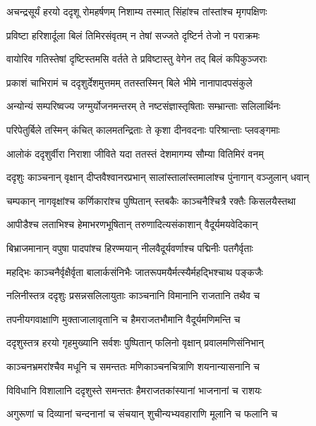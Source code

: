 \twolineshloka
{अचन्द्रसूर्यं हरयो ददृशू रोमहर्षणम्}
{निशाम्य तस्मात् सिंहांश्च तांस्तांश्च मृगपक्षिणः} %

\twolineshloka
{प्रविष्टा हरिशार्दूला बिलं तिमिरसंवृतम्}
{न तेषां सज्जते दृष्टिर्न तेजो न पराक्रमः} %

\twolineshloka
{वायोरिव गतिस्तेषां दृष्टिस्तमसि वर्तते}
{ते प्रविष्टास्तु वेगेन तद् बिलं कपिकुञ्जराः} %

\twolineshloka
{प्रकाशं चाभिरामं च ददृशुर्देशमुत्तमम्}
{ततस्तस्मिन् बिले भीमे नानापादपसंकुले} %

\twolineshloka
{अन्योन्यं सम्परिष्वज्य जग्मुर्योजनमन्तरम्}
{ते नष्टसंज्ञास्तृषिताः सम्भ्रान्ताः सलिलार्थिनः} %

\twolineshloka
{परिपेतुर्बिले तस्मिन् कंचित् कालमतन्द्रिताः}
{ते कृशा दीनवदनाः परिश्रान्ताः प्लवङ्गमाः} %

\twolineshloka
{आलोकं ददृशुर्वीरा निराशा जीविते यदा}
{ततस्तं देशमागम्य सौम्या वितिमिरं वनम्} %

\twolineshloka
{ददृशुः काञ्चनान् वृक्षान् दीप्तवैश्वानरप्रभान्}
{सालांस्तालांस्तमालांश्च पुंनागान् वञ्जुलान् धवान्} %

\twolineshloka
{चम्पकान् नागवृक्षांश्च कर्णिकारांश्च पुष्पितान्}
{स्तबकैः काञ्चनैश्चित्रै रक्तैः किसलयैस्तथा} %

\twolineshloka
{आपीडैश्च लताभिश्च हेमाभरणभूषितान्}
{तरुणादित्यसंकाशान् वैदूर्यमयवेदिकान्} %

\twolineshloka
{बिभ्राजमानान् वपुषा पादपांश्च हिरण्मयान्}
{नीलवैदूर्यवर्णाश्च पद्मिनीः पतगैर्वृताः} %

\twolineshloka
{महद्भिः काञ्चनैर्वृक्षैर्वृता बालार्कसंनिभैः}
{जातरूपमयैर्मत्स्यैर्महद्भिश्चाथ पङ्कजैः} %

\twolineshloka
{नलिनीस्तत्र ददृशुः प्रसन्नसलिलायुताः}
{काञ्चनानि विमानानि राजतानि तथैव च} %

\twolineshloka
{तपनीयगवाक्षाणि मुक्ताजालावृतानि च}
{हैमराजतभौमानि वैदूर्यमणिमन्ति च} %

\twolineshloka
{ददृशुस्तत्र हरयो गृहमुख्यानि सर्वशः}
{पुष्पितान् फलिनो वृक्षान् प्रवालमणिसंनिभान्} %

\twolineshloka
{काञ्चनभ्रमरांश्चैव मधूनि च समन्ततः}
{मणिकाञ्चनचित्राणि शयनान्यासनानि च} %

\twolineshloka
{विविधानि विशालानि ददृशुस्ते समन्ततः}
{हैमराजतकांस्यानां भाजनानां च राशयः} %

\twolineshloka
{अगुरूणां च दिव्यानां चन्दनानां च संचयान्}
{शुचीन्यभ्यवहाराणि मूलानि च फलानि च} %

